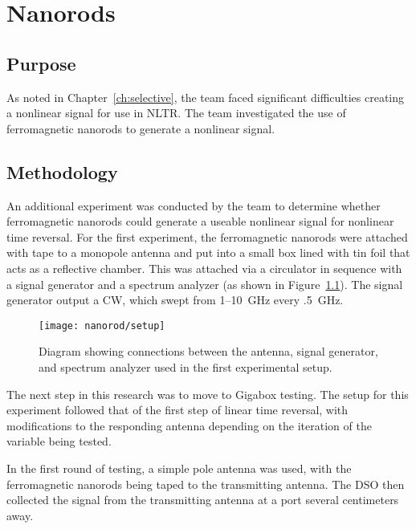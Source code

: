\chapter{Nanorods}

\label{ch:nanorod}

\section{Purpose}

As noted in Chapter~\ref{ch:selective}, the team faced significant difficulties creating a nonlinear signal for use in NLTR.  The team investigated the use of ferromagnetic nanorods to generate a nonlinear signal.

\section{Methodology}
\label{sec:nanorod-meth}

An additional experiment was conducted by the team to determine whether ferromagnetic nanorods could generate a useable nonlinear signal for nonlinear time reversal. For the first experiment, the ferromagnetic nanorods were attached with tape to a monopole antenna and put into a small box lined with tin foil that acts as a reflective chamber. This was attached via a circulator in sequence with a signal generator and a spectrum analyzer (as shown in Figure~\ref{fig:nanorod-setup}). The signal generator output a CW, which swept from \numrange{1}{10}~GHz every .5~GHz.

\begin{figure}[h!]
\centering
\texttt{[image: nanorod/setup]}
    \caption[Initial ferromagnetic nanorod experimental setup]{Diagram showing connections between the antenna, signal generator, and spectrum analyzer used in the first experimental setup.}
    \label{fig:nanorod-setup}
\end{figure}

The next step in this research was to move to Gigabox testing. The setup for this experiment followed that of the first step of linear time reversal, with modifications to the responding antenna depending on the iteration of the variable being tested.

In the first round of testing, a simple pole antenna was used, with the ferromagnetic nanorods being taped to the transmitting antenna. The DSO then collected the signal from the transmitting antenna at a port several centimeters away.

